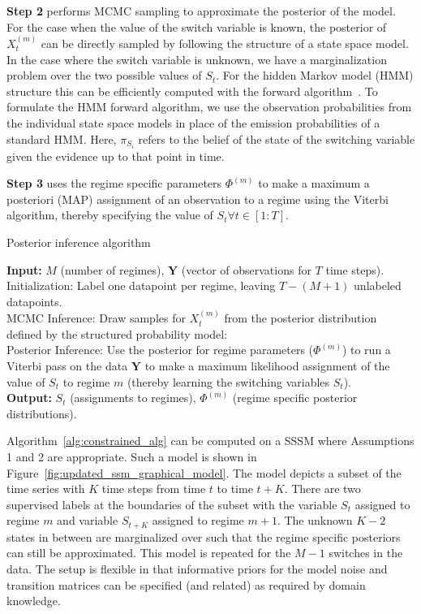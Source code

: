\textbf{Step 2} performs MCMC sampling to approximate the posterior of the model. For the case when the value of the switch variable is known, the posterior of $X^{(m)}_t$ can be directly sampled by following the structure of a state space model. In the case where the switch variable is unknown, we have a marginalization problem over the two possible values of $S_t$. For the hidden Markov model (HMM) structure this can be efficiently computed with the forward algorithm~\citep{shumway2000time}. To formulate the HMM forward algorithm, we use the observation probabilities from the individual state space models in place of the emission probabilities of a standard HMM. Here, $\pi_{S_i}$ refers to the belief of the state of the switching variable given the evidence up to that point in time.

\textbf{Step 3} uses the regime specific parameters $\Phi^{(m)}$ to make a maximum a posteriori (MAP) assignment of an observation to a regime using the Viterbi algorithm, thereby specifying the value of $S_t \forall t \in [1:T]$.

\LinesNotNumbered
\begin{algorithm}
\caption{Posterior inference algorithm}\label{alg:constrained_alg}
\textbf{Input: } $M$ (number of regimes), $\mathbf{Y}$ (vector of observations for $T$ time steps).\\
\nextnr
Initialization: Label one datapoint per regime, leaving $T - (M+1)$ unlabeled datapoints.\\
\nextnr
MCMC Inference: Draw samples for $X_{t}^{(m)}$ from the posterior distribution defined by the structured probability model:\\
\nextnr
Posterior Inference: Use the posterior for regime parameters ($\Phi^{(m)}$) to run a Viterbi pass on the data $\mathbf{Y}$ to make a maximum likelihood assignment of the value of $S_t$ to regime $m$ (thereby learning the switching variables $S_t$).\\
\textbf{Output: } $S_t$ (assignments to regimes), $\Phi^{(m)}$ (regime specific posterior distributions).
\end{algorithm}

 Algorithm~\ref{alg:constrained_alg} can be computed on a SSSM where Assumptions 1 and 2 are appropriate. Such a model is shown in Figure~\ref{fig:updated_ssm_graphical_model}. The model depicts a subset of the time series with $K$ time steps from time $t$ to time $t+K$. There are two supervised labels at the boundaries of the subset with the variable $S_t$ assigned to regime $m$ and variable $S_{t+K}$ assigned to regime $m+1$. The unknown $K-2$ states in between are marginalized over such that the regime specific posteriors can still be approximated. This model is repeated for the $M-1$ switches in the data. The setup is flexible in that informative priors for the model noise and transition matrices can be specified (and related) as required by domain knowledge.

